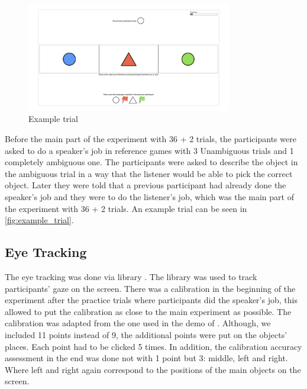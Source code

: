 \begin{figure}
    \centering
    \includegraphics[width=0.8\textwidth]{images/example_trial.png}
    \caption{Example trial}
    \label{fig:example_trial}
\end{figure}

Before the main part of the experiment with 36 + 2 trials, the participants were asked to do a speaker's job in reference games with 3 Unambiguous trials and 1 completely ambiguous one. The participants were asked to describe the object in the ambiguous trial in a way that the listener would be able to pick the correct object. Later they were told that a previous participant had already done the speaker's job and they were to do the listener's job, which was the main part of the experiment with 36 + 2 trials. An example trial can be seen in \autoref{fig:example_trial}.

\subsection{Eye Tracking}
\label{sec:data:eyetr}
The eye tracking was done via library \cite{wegbazer}. The library was used to track participants' gaze on the screen. There was a calibration in the beginning of the experiment after the practice trials where participants did the speaker's job, this allowed to put the calibration as close to the main experiment as possible. The calibration was adapted from the one used in the demo of \cite{wegbazer}. Although, we included 11 points instead of 9, the additional points were put on the objects' places. Each point had to be clicked 5 times. In addition, the calibration accuracy assessment in the end was done not with 1 point but 3: middle, left and right. Where left and right again correspond to the positions of the main objects on the screen. 

